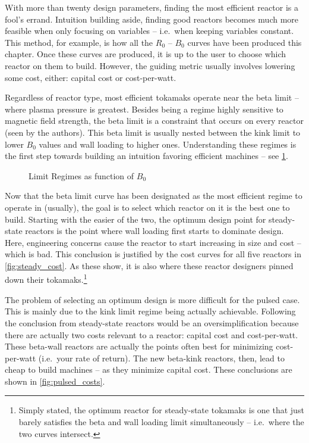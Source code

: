 \label{subsection:design_point}

With more than twenty design parameters, finding the most efficient reactor is a fool's errand. Intuition building aside, finding good reactors becomes much more feasible when only focusing on  variables -- i.e.\ when keeping  variables constant. This method, for example, is how all the $R_0$ -- $B_0$ curves have been produced this chapter. Once these curves are produced, it is up to the user to choose which reactor on them to build. However, the guiding metric usually involves lowering some cost, either: capital cost or cost-per-watt.

Regardless of reactor type, most efficient tokamaks operate near the beta limit -- where plasma pressure is greatest. Besides being a regime highly sensitive to magnetic field strength, the beta limit is a constraint that occurs on every reactor (seen by the authors). This beta limit is usually nested between the kink limit to lower $B_0$ values and wall loading to higher ones. Understanding these regimes is the first step towards building an intuition favoring efficient machines -- see \cref{fig:limit_regimes}.

\begin{figure}
\centering
\begin{adjustbox}{width=0.75\textwidth}
	
\end{adjustbox}
\caption{Limit Regimes as function of $B_0$}
\label{fig:limit_regimes}
\end{figure}

Now that the beta limit curve has been designated as the most efficient regime to operate in (usually), the goal is to select which reactor on it is the best one to build. Starting with the easier of the two, the optimum design point for steady-state reactors is the point where wall loading first starts to dominate design. Here, engineering concerns cause the reactor to start increasing in size and cost -- which is bad. This conclusion is justified by the cost curves for all five reactors in \cref{fig:steady_cost}. As these show, it is also where these reactor designers pinned down their tokamaks.\footnote{ Simply stated, the optimum reactor for steady-state tokamaks is one that just barely satisfies the beta and wall loading limit simultaneously -- i.e.\ where the two curves intersect. }

The problem of selecting an optimum design is more difficult for the pulsed case. This is mainly due to the kink limit regime being actually achievable. Following the conclusion from steady-state reactors would be an oversimplification because there are actually two costs relevant to a reactor: capital cost and cost-per-watt. These beta-wall reactors are actually the points often best for minimizing cost-per-watt (i.e.\ your rate of return). The new beta-kink reactors, then, lead to cheap to build machines -- as they minimize capital cost. These conclusions are shown in \cref{fig:pulsed_costs}.

